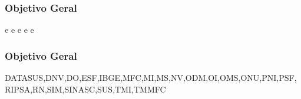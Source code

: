 	\lipsum[2]
\subsubsection{Objetivo Geral}
	\lipsum[2]
	\cite{lamport1986latex} e \cite{wessberg2000real} e \cite{knuth} e \cite{lamport} e \cite{Maia2011} e \cite{mortalidade}
	
\subsubsection{Objetivo Geral}
	\lipsum[2]
	\acrlong{DATASUS},\acrlong{DNV},\acrlong{DO},\acrlong{ESF},\acrlong{IBGE},\acrlong{MFC},\acrlong{MI},\acrlong{MS},\acrlong{NV},\acrlong{ODM},\acrlong{OI},\acrlong{OMS},\acrlong{ONU},\acrlong{PNI},\acrlong{PSF},\acrlong{RIPSA},\acrlong{RN},\acrlong{SIM},\acrlong{SINASC},\acrlong{SUS},\acrlong{TMI},\acrlong{TMMFC}
	